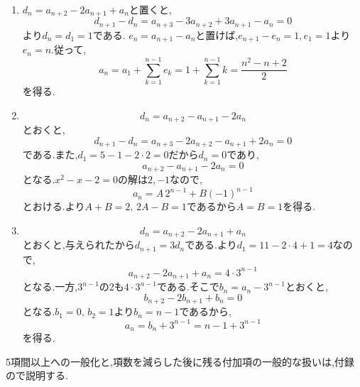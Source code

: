 \noindent{}\par\nobreak
\begin{enumerate}[label=(\arabic*),parsep=3pt,format=\bookitemlink{example-four-term-1}{solution}{problem}]
  \item $d_n=a_{n+2}-2a_{n+1}+a_n$と置くと,
    \[
      d_{n+1}-d_n=a_{n+3}-3a_{n+2}+3a_{n+1}-a_n=0
    \]
    より$d_n=d_1=1$である.
    $e_n=a_{n+1}-a_n$と置けば,$e_{n+1}-e_n=1,e_1=1$より$e_n=n$.従って,
    \[
      a_n=a_1+\sum_{k=1}^{n-1}e_k
      =1+\sum_{k=1}^{n-1}k
      =\frac{n^2-n+2}{2}
    \]
    を得る.
  \item
    \[
      d_n=a_{n+2}-a_{n+1}-2a_n
    \]
    とおくと,
    \[
      d_{n+1}-d_n=a_{n+3}-2a_{n+2}-a_{n+1}+2a_n=0
    \]
    である.また,$d_1=5-1-2\cdot2=0$だから$d_n=0$であり,
    \[
      a_{n+2}-a_{n+1}-2a_n=0
    \]
    となる.$x^2-x-2=0$の解は$2,-1$なので,
    \[
      a_n=A\,2^{n-1}+B(-1)^{n-1}
    \]
    とおける.より$A+B=2,\,2A-B=1$であるから$A=B=1$を得る.
  \item
    \[
      d_n=a_{n+2}-2a_{n+1}+a_n
    \]
    とおくと,与えられたから$d_{n+1}=3d_n$である.より$d_1=11-2\cdot4+1=4$なので,
    \[
      a_{n+2}-2a_{n+1}+a_n=4\cdot3^{n-1}
    \]
    となる.一方,$3^{n-1}$の2も$4\cdot3^{n-1}$である.そこで$b_n=a_n-3^{n-1}$とおくと,
    \[
      b_{n+2}-2b_{n+1}+b_n=0
    \]
    となる.$b_1=0,\,b_2=1$より$b_n=n-1$であるから,
    \[
      a_n=b_n+3^{n-1}=n-1+3^{n-1}
    \]
    を得る.
\end{enumerate}

5項間以上への一般化と,項数を減らした後に残る付加項の一般的な扱いは,付録ので説明する.
